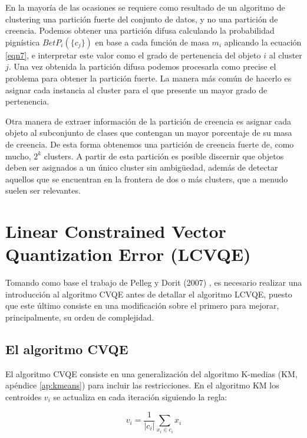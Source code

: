 En la mayoría de las ocasiones se requiere como resultado de un algoritmo de clustering una partición fuerte del conjunto de datos, y no una partición de creencia. Podemos obtener una partición difusa calculando la probabilidad pignística $BetP_i(\{c_j\})$ en base a cada función de masa $m_i$ aplicando la ecuación \ref{eqn7}, e interpretar este valor como el grado de pertenencia del objeto $i$ al cluster $j$. Una vez obtenida la partición difusa podemos procesarla como precise el problema para obtener la partición fuerte. La manera más común de hacerlo es asignar cada instancia al cluster para el que presente un mayor grado de pertenencia.

Otra manera de extraer información de la partición de creencia es asignar cada objeto al subconjunto de clases que contengan un mayor porcentaje de su masa de creencia. De esta forma obtenemos una partición de creencia fuerte de, como mucho, $2^k$ clusters. A partir de esta partición es posible discernir que objetos deben ser asignados a un único cluster sin ambigüedad, además de detectar aquellos que se encuentran en la frontera de dos o más clusters, que a menudo suelen ser relevantes.

\clearpage

\section{Linear Constrained Vector Quantization Error (LCVQE)} \label{lcvqe}

Tomando como base el trabajo de Pelleg y Dorit (2007) \cite{LCVQE:2007}, es necesario realizar una introducción al algoritmo \acf{CVQE} antes de detallar el algoritmo \acs{LCVQE}, puesto que este último consiste en una modificación sobre el primero para mejorar, principalmente, su orden de complejidad.

\subsection{El algoritmo CVQE}

El algoritmo \acs{CVQE} consiste en una generalización del algoritmo K-medias (\acs{KM}, apéndice \ref{ap:kmeans}) para incluir las restricciones. En el algoritmo \acs{KM} los centroides $v_i$ se actualiza en cada iteración siguiendo la regla:

\begin{equation}
v_i = \frac{1}{|c_i|} \sum_{x_i \in c_i} x_i
\label{eqn27}
\end{equation}

